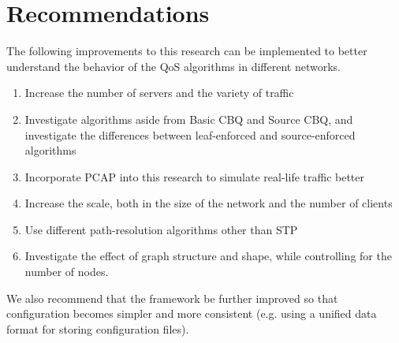 \section{Recommendations}
The following improvements to this research can be implemented to better understand the behavior of the QoS algorithms in different networks.
\begin{enumerate}
    \item Increase the number of servers and the variety of traffic
    \item Investigate algorithms aside from Basic CBQ and Source CBQ, and investigate the differences between leaf-enforced and source-enforced algorithms
    \item Incorporate PCAP into this research to simulate real-life traffic better
    \item Increase the scale, both in the size of the network and the number of clients
    \item Use different path-resolution algorithms other than STP
    \item Investigate the effect of graph structure and shape, while controlling for the number of nodes.
\end{enumerate}

We also recommend that the framework be further improved so that configuration becomes simpler and more consistent (e.g. using a unified data format for storing configuration files).